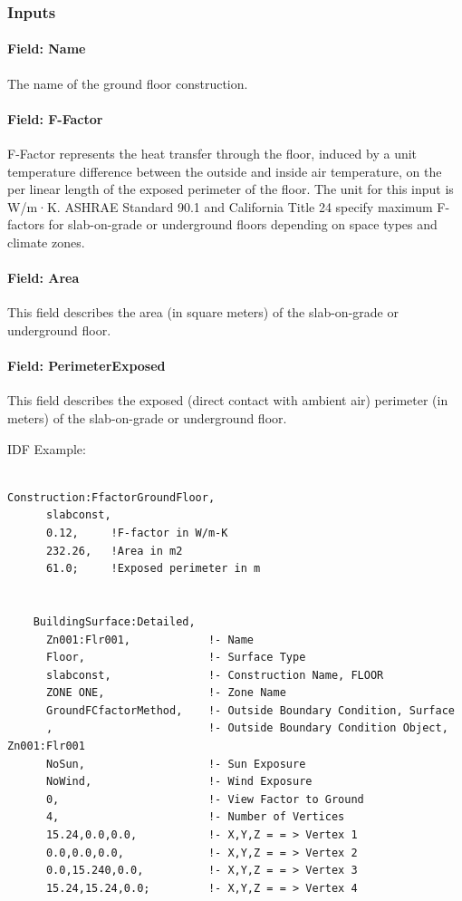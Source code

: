 \subsubsection{Inputs}\label{inputs-37}

\paragraph{Field: Name}\label{field-name-30-000}

The name of the ground floor construction.

\paragraph{Field: F-Factor}\label{field-f-factor}

F-Factor represents the heat transfer through the floor, induced by a unit temperature difference between the outside and inside air temperature, on the per linear length of the exposed perimeter of the floor. The unit for this input is W/m·K. ASHRAE Standard 90.1 and California Title 24 specify maximum F-factors for slab-on-grade or underground floors depending on space types and climate zones.

\paragraph{Field: Area}\label{field-area}

This field describes the area (in square meters) of the slab-on-grade or underground floor.

\paragraph{Field: PerimeterExposed}\label{field-perimeterexposed}

This field describes the exposed (direct contact with ambient air) perimeter (in meters) of the slab-on-grade or underground floor.

IDF Example:

\begin{lstlisting}

Construction:FfactorGroundFloor,
      slabconst,
      0.12,     !F-factor in W/m-K
      232.26,   !Area in m2
      61.0;     !Exposed perimeter in m


    BuildingSurface:Detailed,
      Zn001:Flr001,            !- Name
      Floor,                   !- Surface Type
      slabconst,               !- Construction Name, FLOOR
      ZONE ONE,                !- Zone Name
      GroundFCfactorMethod,    !- Outside Boundary Condition, Surface
      ,                        !- Outside Boundary Condition Object, Zn001:Flr001
      NoSun,                   !- Sun Exposure
      NoWind,                  !- Wind Exposure
      0,                       !- View Factor to Ground
      4,                       !- Number of Vertices
      15.24,0.0,0.0,           !- X,Y,Z = = > Vertex 1
      0.0,0.0,0.0,             !- X,Y,Z = = > Vertex 2
      0.0,15.240,0.0,          !- X,Y,Z = = > Vertex 3
      15.24,15.24,0.0;         !- X,Y,Z = = > Vertex 4
\end{lstlisting}

